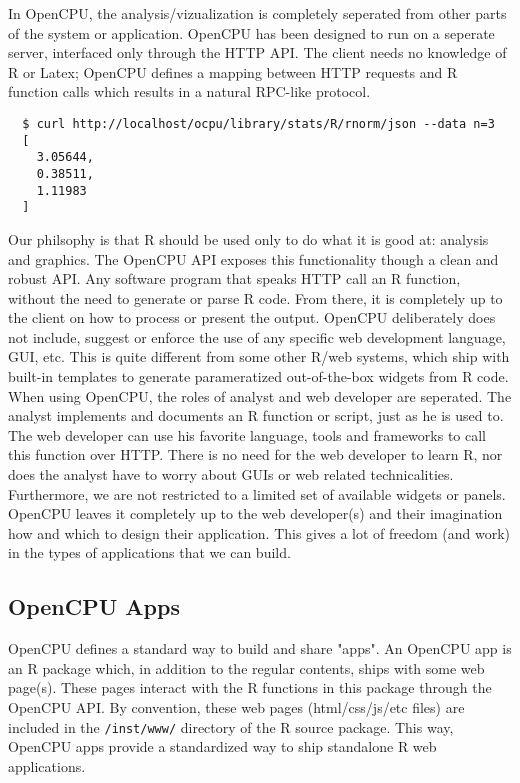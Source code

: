\documentclass{scrartcl}\usepackage[]{graphicx}\usepackage[]{color}
\begin{document}
In OpenCPU, the analysis/vizualization is completely seperated from other parts of the system or application. OpenCPU has been designed to run on a seperate server, interfaced only through the HTTP API. The client needs no knowledge of R or Latex; OpenCPU defines a mapping between HTTP requests and R function calls which results in a natural RPC-like protocol.  

\begin{verbatim}
  $ curl http://localhost/ocpu/library/stats/R/rnorm/json --data n=3
  [
    3.05644,
    0.38511,
    1.11983
  ]
\end{verbatim}

\noindent Our philsophy is that R should be used only to do what it is good at: analysis and graphics. The OpenCPU API exposes this functionality though a clean and robust API. Any software program that speaks HTTP call an R function, without the need to generate or parse R code. From there, it is completely up to the client on how to process or present the output. OpenCPU deliberately does not include, suggest or enforce the use of any specific web development language, GUI, etc. This is quite different from some other R/web systems, which ship with built-in templates to generate parameratized out-of-the-box widgets from R code.  \\

When using OpenCPU, the roles of analyst and web developer are seperated. The analyst implements and documents an R function or script, just as he is used to. The web developer can use his favorite language, tools and frameworks to call this function over HTTP. There is no need for the web developer to learn R, nor does the analyst have to worry about GUIs or web related technicalities. Furthermore, we are not restricted to a limited set of available widgets or panels. OpenCPU leaves it completely up to the web developer(s) and their imagination how and which to design their application. This gives a lot of freedom (and work) in the types of applications that we can build.

\subsection{OpenCPU Apps}

OpenCPU defines a standard way to build and share "apps". An OpenCPU app is an R package which, in addition to the regular contents, ships with some web page(s). These pages interact with the R functions in this package through the OpenCPU API. By convention, these web pages (html/css/js/etc files) are included in the \texttt{/inst/www/} directory of the R source package. This way, OpenCPU apps provide a standardized way to ship standalone R web applications. \\
\end{document}
